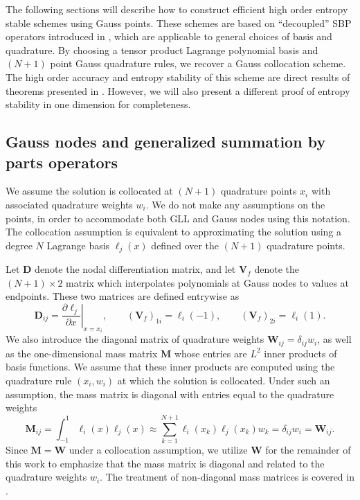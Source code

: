 \documentclass[onefignum,onetabnum,final]{siamart171218}
\newcommand{\pd}[2]{\frac{\partial#1}{\partial#2}}
\newcommand{\LRp}[1]{\left( #1 \right)}
\newcommand{\LRl}[1]{\left. #1 \right|}
\begin{document}
The following sections will describe how to construct efficient high order entropy stable schemes using Gauss points.  These schemes are based on ``decoupled'' SBP operators introduced in \cite{chan2017discretely, chan2018discretely}, which are applicable to general choices of basis and quadrature.  By choosing a tensor product Lagrange polynomial basis and $(N+1)$ point Gauss quadrature rules, we recover a Gauss collocation scheme.  The high order accuracy and entropy stability of this scheme are direct results of theorems presented in  \cite{chan2017discretely, chan2018discretely}.  However, we will also present a different proof of entropy stability in one dimension for completeness.  

\subsection{Gauss nodes and generalized summation by parts operators}
\label{sec:gsbp}
We assume the solution is collocated at $(N+1)$ quadrature points $x_i$ with associated quadrature weights $w_i$.  We do not make any assumptions on the points, in order to accommodate both GLL and Gauss nodes using this notation.  The collocation assumption is equivalent to approximating the solution using a degree $N$ Lagrange basis $\ell_j(x)$ defined over the $(N+1)$ quadrature points.  

Let $\bm{D}$ denote the nodal differentiation matrix, and let $\bm{V}_f$ denote the $(N+1)\times 2$ matrix which interpolates polynomials at Gauss nodes to values at endpoints.  These two matrices are defined entrywise as
\[
\bm{D}_{ij} = \LRl{\pd{\ell_j}{x}}_{x = x_i}, \qquad \LRp{\bm{V}_f}_{1i} = \ell_i(-1), \qquad  \LRp{\bm{V}_f}_{2i} = \ell_i(1).
\]
We also introduce the diagonal matrix of quadrature weights $\bm{W}_{ij} = \delta_{ij} w_i$, as well as the one-dimensional mass matrix $\bm{M}$ whose entries are $L^2$ inner products of basis functions.  We assume that these inner products are computed using the quadrature rule $(x_i, w_i)$ at which the solution is collocated.  Under such an assumption, the mass matrix is diagonal with entries equal to the quadrature weights
\[
\bm{M}_{ij} = \int_{-1}^1 \ell_i(x)\ell_j(x) \approx \sum_{k=1}^{N+1} \ell_i(x_k)\ell_j(x_k) w_k = \delta_{ij} w_i = \bm{W}_{ij}.
\]
Since $\bm{M} = \bm{W}$ under a collocation assumption, we utilize $\bm{W}$ for the remainder of this work to emphasize that the mass matrix is diagonal and related to the quadrature weights $w_i$.  The treatment of non-diagonal mass matrices is covered in \cite{chan2017discretely, chan2018discretely}.
\end{document}
